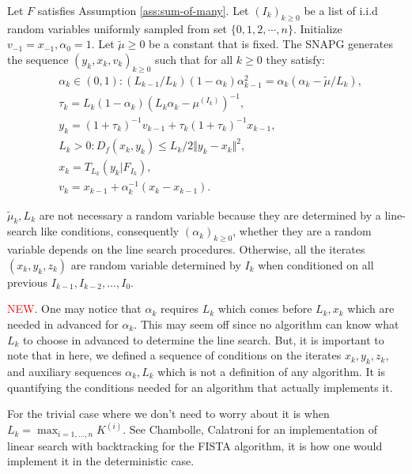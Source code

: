 \documentclass[12pt]{article}
\begin{document}
    \begin{definition}[SNAPG-V2]\label{def:snapg-v2}
        Let $F$ satisfies Assumption \ref{ass:sum-of-many}. 
        Let $(I_k)_{k \ge 0}$ be a list of i.i.d random variables uniformly sampled from set $\{0, 1, 2, \cdots, n\}$. 
        Initialize $v_{-1} = x_{-1}, \alpha_0 = 1$. 
        Let $\tilde \mu \ge 0$ be a constant that is fixed.
        The SNAPG generates the sequence $(y_k, x_k, v_k)_{k \ge 0}$ such that for all $k \ge 0$ they satisfy: 
        \begin{align*}
            & \alpha_k \in (0, 1): (L_{k - 1}/L_k)(1 - \alpha_{k})\alpha_{k - 1}^2 = \alpha_{k}\left(\alpha_{k} - \tilde \mu/L_k\right), \\
            & \tau_k = L_k(1 - \alpha_k)\left(L_k \alpha_k - \mu^{(I_k)}\right)^{-1}, \\
            & y_k = (1 + \tau_k)^{-1}v_{k - 1} + \tau_k(1 + \tau_k)^{-1}x_{k - 1}, \\
            & L_k > 0: D_f(x_k, y_k) \le L_k/2\Vert y_k - x_k\Vert^2, \\
            & x_k =  T_{L_k}(y_k | F_{I_k}), \\
            & v_k = x_{k - 1} + \alpha_k^{-1}(x_k - x_{k - 1}). 
        \end{align*}
    \end{definition}
    \begin{remark}
        $\tilde \mu_k, L_k$ are not necessary a random variable because they are determined by a line-search like conditions, consequently $(\alpha_k)_{k\ge 0}$, whether they are a random variable depends on the line search procedures. 
        Otherwise, all the iterates $(x_k, y_k, z_k)$ are random variable determined by $I_k$ when conditioned on all previous $I_{k - 1}, I_{k - 2}, \ldots, I_{0}$. 
        \par
        \textcolor{red}{NEW}. One may notice that $\alpha_k$ requires $L_k$ which comes before $L_k, x_k$ which are needed in advanced for $\alpha_k$. 
        This may seem off since no algorithm can know what $L_k$ to choose in advanced to determine the line search. 
        But, it is important to note that in here, we defined a sequence of conditions on the iterates $x_k, y_k, z_k$, and auxiliary sequences $\alpha_k, L_k$ which is not a definition of any algorithm. 
        It is quantifying the conditions needed for an algorithm that actually implements it.
        \par
        For the trivial case where we don't need to worry about it is when $L_k = \max_{i = 1, \ldots, n} K^{(i)}$. 
        See Chambolle, Calatroni \cite{calatroni_backtracking_2019} for an implementation of linear search with backtracking for the FISTA algorithm, it is how one would implement it in the deterministic case. 
    \end{remark}
\end{document}
